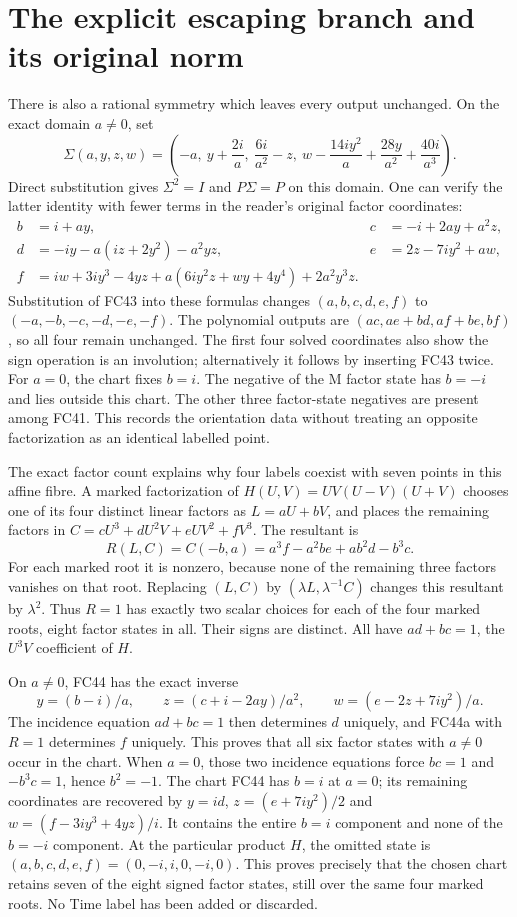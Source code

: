 \documentclass[11pt]{article}
\begin{document}
\section{The explicit escaping branch and its original norm}
There is also a rational symmetry which leaves every output unchanged.
On the exact domain $a\ne0$, set
\[
 \Sigma(a,y,z,w)=\left(-a,\ y+\frac{2i}{a},\
 \frac{6i}{a^2}-z,\
 w-\frac{14iy^2}{a}+\frac{28y}{a^2}+\frac{40i}{a^3}\right).
 \tag{FC43}
\]
Direct substitution gives $\Sigma^2=I$ and $P\Sigma=P$ on this
domain. One can verify the latter identity with fewer terms in the
reader's original factor coordinates:
\[
\begin{aligned}
 b&=i+ay,&c&=-i+2ay+a^2z,\\
 d&=-iy-a(iz+2y^2)-a^2yz,&e&=2z-7iy^2+aw,\\
 f&=iw+3iy^3-4yz+a(6iy^2z+wy+4y^4)+2a^2y^3z.
\end{aligned}\tag{FC44}
\]
Substitution of FC43 into these formulas changes
$(a,b,c,d,e,f)$ to $(-a,-b,-c,-d,-e,-f)$.
The polynomial outputs are $(ac,ae+bd,af+be,bf)$, so all four
remain unchanged. The first four solved coordinates also show the
sign operation is an involution; alternatively it follows by inserting
FC43 twice. For $a=0$, the chart fixes $b=i$. The negative of the
$\mathrm M$ factor state has $b=-i$ and lies outside this chart.
The other three factor-state negatives are present among FC41.
This records the orientation data without treating an opposite
factorization as an identical labelled point.

The exact factor count explains why four labels coexist with seven
points in this affine fibre. A marked factorization of
$H(U,V)=UV(U-V)(U+V)$ chooses one of its four distinct linear factors
as $L=aU+bV$, and places the remaining factors in
$C=cU^3+dU^2V+eUV^2+fV^3$. The resultant is
\[
 R(L,C)=C(-b,a)=a^3f-a^2be+ab^2d-b^3c.
 \tag{FC44a}
\]
For each marked root it is nonzero, because none of the remaining
three factors vanishes on that root. Replacing $(L,C)$ by
$(\lambda L,\lambda^{-1}C)$ changes this resultant by $\lambda^2$.
Thus $R=1$ has exactly two scalar choices for each of the four
marked roots, eight factor states in all. Their signs are distinct.
All have $ad+bc=1$, the $U^3V$ coefficient of $H$.

On $a\ne0$, FC44 has the exact inverse
\[
 y=(b-i)/a,\qquad z=(c+i-2ay)/a^2,\qquad
 w=(e-2z+7iy^2)/a.
 \tag{FC44b}
\]
The incidence equation $ad+bc=1$ then determines $d$ uniquely, and
FC44a with $R=1$ determines $f$ uniquely. This proves that all six
factor states with $a\ne0$ occur in the chart. When $a=0$, those two
incidence equations force $bc=1$ and $-b^3c=1$, hence $b^2=-1$.
The chart FC44 has $b=i$ at $a=0$; its remaining coordinates are
recovered by $y=id$, $z=(e+7iy^2)/2$ and
$w=(f-3iy^3+4yz)/i$. It contains the entire $b=i$ component and none
of the $b=-i$ component. At the particular product $H$, the omitted
state is $(a,b,c,d,e,f)=(0,-i,i,0,-i,0)$. This proves precisely that
the chosen chart retains seven of the eight signed factor states,
still over the same four marked roots. No Time label has been added
or discarded.
\end{document}
